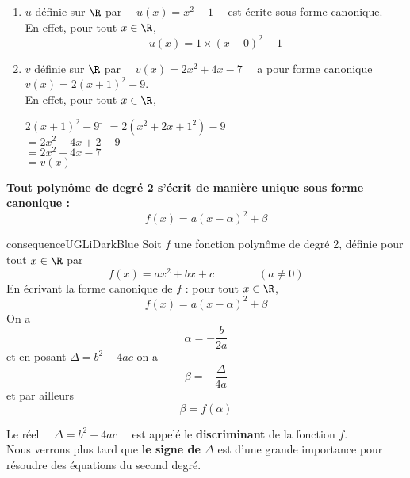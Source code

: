 \documentclass[a4paper,11pt,cours]{nsi}
\begin{document}
\begin{exemple}[s]
	\begin{enumerate}[label=\textbullet]

		\item 	$u$ définie sur $\R$ par $\quad u(x)=x^2+1\quad$ est écrite sous forme canonique.\\
		En effet, pour tout $x\in\R$, $$u(x)=1\times(x-0)^2+1$$
		\item 	$v$ définie sur $\R$ par $\quad v(x)=2x^2+4x-7 \quad$ a pour forme canonique\\ $v(x)=2(x+1)^2-9$.\\
		En effet, pour tout $x\in\R$,
		\begin{tabbing}
			$2(x+1)^2-9$	\=	$=2(x^2+2x+1^2)-9$\\
			\>	$=2x^2+4x+2-9$\\
			\>	$=2x^2+4x-7$\\
			\>	$=v(x)$
		\end{tabbing}
	\end{enumerate}
\end{exemple}

\begin{propriete}
	\textbf{Tout polynôme de degré 2 s'écrit de manière unique sous forme canonique :}
	{\boldmath $$f(x)=a(x-\alpha)^2+\beta$$}
\end{propriete}	

\begin{demonstration}
\end{demonstration}


\begin{encadrecolore}{consequence}{UGLiDarkBlue}
	Soit $f$ une fonction polynôme de degré 2, définie pour tout $x\in\R$ par
	$$f(x)=ax^2+bx+c\qquad\qquad(a\neq 0)$$
	En écrivant la forme canonique de $f$ : pour tout $x\in\R$,
	$$f(x)=a(x-\alpha)^2+\beta$$
	On a {\boldmath $$\alpha=-\dfrac{b}{2a}$$ et en posant $\Delta=b^2-4ac$ on a $$\beta=-\dfrac{\Delta}{4a}$$
		et par ailleurs $$\beta = f(\alpha)$$}
\end{encadrecolore}

\begin{demonstration}
\end{demonstration}

\begin{definition}
	Le réel $\quad \Delta=b^2-4ac \quad$ est appelé le \textbf{discriminant} de la fonction $f$.\\
	Nous verrons plus tard que \textbf{le signe de $\Delta$} est d'une grande importance pour résoudre des équations du second degré.
\end{definition}	
\end{document}
